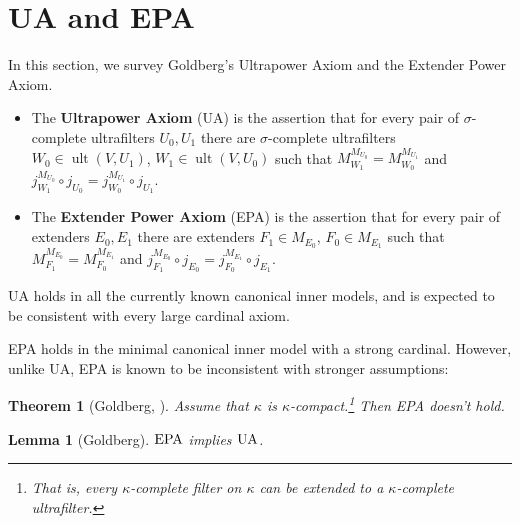 \documentclass{article}
\theoremstyle{definition}
\theoremstyle{plain}
\newtheorem{theorem}[definition]{Theorem}
\newtheorem{lemma}[definition]{Lemma}
\DeclareMathOperator{\Ult}{ult}
\begin{document}
\section{{\rm UA} and {\rm EPA}}\label{Sec:BackgroundUAandEPA}

In this section, we survey Goldberg's Ultrapower Axiom and the Extender Power Axiom. 

\begin{itemize}
    \item The \textbf{Ultrapower Axiom} ({\rm UA}) is the assertion that for every pair of $\sigma$-complete ultrafilters $U_0, U_1$ there are $\sigma$-complete ultrafilters $W_0\in \Ult(V, U_1)$, $W_1\in \Ult(V, U_0)$ such that $M^{M_{U_0}}_{W_1} = M^{M_{U_1}}_{W_0}$ and $j^{M_{U_0}}_{W_1}\circ j_{U_0} = j^{M_{U_1}}_{W_0}\circ j_{U_1}$.
    \item The \textbf{Extender Power Axiom} ({\rm EPA}) is the assertion that for every pair of extenders $E_0, E_1$ there are extenders $F_1\in M_{E_0}$, $F_0\in M_{E_1}$ such that $M^{M_{E_0}}_{F_1} = M^{M_{E_1}}_{F_0}$ and $j^{M_{E_0}}_{F_1}\circ j_{E_0} = j^{M_{E_1}}_{F_0} \circ j_{E_1}$. 
\end{itemize}




{\rm UA} holds in all the currently known canonical inner models, and is expected to be consistent with every large cardinal axiom.

{\rm EPA} holds in the minimal canonical inner model with a strong cardinal. However, unlike {\rm UA}, {\rm EPA} is known to be inconsistent with stronger assumptions:

\begin{theorem}[Goldberg, { \cite[Theorem 2.3]{GoldbergGeneralizationsUA}}]\label{Thm:GoldbergExtenderAxiomCanBeInconsistent}
    Assume that $\kappa$ is $\kappa$-compact.\footnote{That is, every $\kappa$-complete filter on $\kappa$ can be extended to a $\kappa$-complete ultrafilter.} Then {\rm EPA} doesn't hold.
\end{theorem}


\begin{lemma}[Goldberg]\label{Lem:UAFollowsfromEPA}
    ${\rm EPA}$ implies ${\rm UA}$.
\end{lemma}
\end{document}
